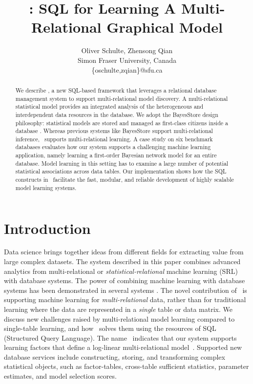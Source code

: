 \documentclass{IEEEtran}
\begin{document}
\title{\FB: SQL for Learning A  Multi-Relational Graphical Model}
\author{
Oliver Schulte, Zhensong Qian\\
 Simon Fraser University, Canada\\
\{oschulte,zqian\}@sfu.ca
}

\maketitle  
\begin{abstract} 
We describe \FB, a new SQL-based framework that leverages a relational database management system to support multi-relational model discovery. A multi-relational statistical model provides an integrated analysis of the heterogeneous and interdependent data resources in the database.  We adopt the BayesStore design philosophy: statistical models are stored and managed as first-class citizens inside a database \cite{Wang2008}. Whereas previous systems like BayesStore support multi-relational inference, \FB\ supports multi-relational learning. 
A case study on six benchmark databases evaluates how our system supports a challenging machine learning application, namely learning a first-order Bayesian network model for an entire database. Model learning in this setting has to examine a large number of potential statistical associations across data tables. Our implementation shows how the SQL constructs in \FB\ facilitate the fast, modular, and reliable development of highly scalable model learning systems.

\end{abstract}

\section{Introduction} Data science brings together ideas from different fields for extracting value from large complex datasets. The system described in this paper combines advanced analytics from multi-relational or {\em statistical-relational} machine learning (SRL) with database systems. The power of combining machine learning with database systems has been demonstrated in several systems 
\cite{MADlib_VLDB_2012,MLbase_ICDR_2013,Deshpande2006}.
The novel contribution of \FB\ is supporting machine learning for {\em multi-relational} data, rather than for traditional learning where the  data are represented in a {\em single} table or data matrix.
We discuss new challenges raised by multi-relational model learning compared to single-table learning, and how \FB\ solves them using the resources of SQL (Structured Query Language). The name \FB\ indicates that our system supports learning factors that define a log-linear multi-relational model~\cite{Kimmig2015}. Supported new database services include constructing, storing, and transforming complex statistical objects, such as factor-tables, cross-table sufficient statistics, parameter estimates, and model selection scores.
\end{document}
